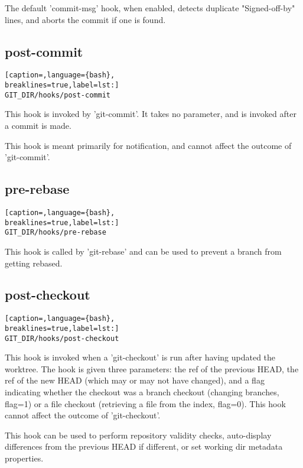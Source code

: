 The default 'commit-msg' hook, when enabled, detects duplicate "Signed-off-by"
lines, and aborts the commit if one is found.

\subsection{post-commit}
\lstset{basicstyle=\scriptsize, numbers=none, captionpos=b, tabsize=4}
\begin{lstlisting}[caption=,language={bash},
breaklines=true,label=lst:]
GIT_DIR/hooks/post-commit
\end{lstlisting}

This hook is invoked by 'git-commit'. It takes no parameter, and is invoked
after a commit is made.

This hook is meant primarily for notification, and cannot affect the outcome of
'git-commit'.

\subsection{pre-rebase}
\lstset{basicstyle=\scriptsize, numbers=none, captionpos=b, tabsize=4}
\begin{lstlisting}[caption=,language={bash},
breaklines=true,label=lst:]
GIT_DIR/hooks/pre-rebase
\end{lstlisting}

This hook is called by 'git-rebase' and can be used to prevent a branch from
getting rebased.

\subsection{post-checkout}
\lstset{basicstyle=\scriptsize, numbers=none, captionpos=b, tabsize=4}
\begin{lstlisting}[caption=,language={bash},
breaklines=true,label=lst:]
GIT_DIR/hooks/post-checkout
\end{lstlisting}

This hook is invoked when a 'git-checkout' is run after having updated the
worktree. The hook is given three parameters: the ref of the previous HEAD, the
ref of the new HEAD (which may or may not have changed), and a flag indicating
whether the checkout was a branch checkout (changing branches, flag=1) or a
file checkout (retrieving a file from the index, flag=0). This hook cannot
affect the outcome of 'git-checkout'.

This hook can be used to perform repository validity checks, auto-display
differences from the previous HEAD if different, or set working dir metadata
properties.

